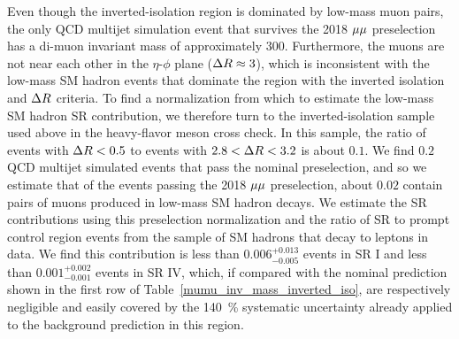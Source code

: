 Even though the inverted-isolation region is dominated by low-mass muon pairs, the only QCD multijet simulation event that survives the 2018 ${\mu}{\mu}$ preselection has a di-muon invariant mass of approximately 300\GeV. Furthermore, the muons are not near each other in the $\eta$-$\phi$ plane ($\Delta R\approx3$), which is inconsistent with the low-mass SM hadron events that dominate the region with the inverted isolation and $\Delta R$ criteria. To find a normalization from which to estimate the low-mass SM hadron SR contribution, we therefore turn to the inverted-isolation sample used above in the heavy-flavor meson cross check. In this sample, the ratio of events with $\Delta R<0.5$ to events with $2.8<\Delta R<3.2$ is about $0.1$. We find $0.2$ QCD multijet simulated events that pass the nominal preselection, and so we estimate that of the events passing the 2018 ${\mu}{\mu}$ preselection, about $0.02$ contain pairs of muons produced in low-mass SM hadron decays. We estimate the SR contributions using this preselection normalization and the ratio of SR to prompt control region events from the sample of SM hadrons that decay to leptons in data. We find this contribution is less than $0.006^{+0.013}_{-0.005}$ events in SR I and less than $0.001^{+0.002}_{-0.001}$ events in SR IV, which, if compared with the nominal prediction shown in the first row of Table~\ref{mumu_inv_mass_inverted_iso}, are respectively negligible and easily covered by the \SI{140}{\percent} systematic uncertainty already applied to the background prediction in this region.

\pagebreak